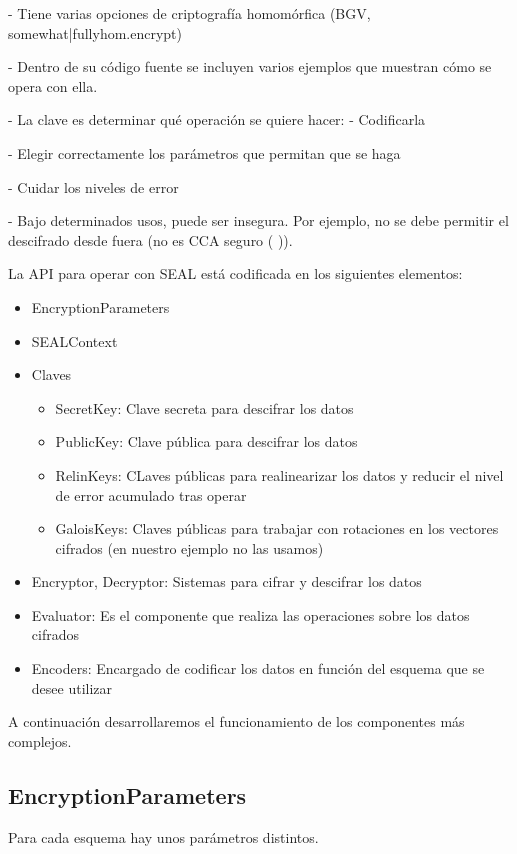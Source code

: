 - Tiene varias opciones de criptografía homomórfica (BGV, {somewhat|fully}hom.encrypt)

- Dentro de su código fuente se incluyen varios ejemplos que muestran cómo se opera con ella.

- La clave es determinar qué operación se quiere hacer:
    - Codificarla

    - Elegir correctamente los parámetros que permitan que se haga

    - Cuidar los niveles de error

- Bajo determinados usos, puede ser insegura. Por ejemplo, no se debe permitir el descifrado desde fuera (no es CCA seguro (\cite{peng_danger_2019} )).

La API para operar con SEAL está codificada en los siguientes elementos:

\begin{itemize}
  \item EncryptionParameters
  \item SEALContext
  \item Claves
  \begin{itemize}
    \item SecretKey: Clave secreta para descifrar los datos
    \item PublicKey: Clave pública para descifrar los datos
    \item RelinKeys: CLaves públicas para realinearizar los datos y reducir el nivel de error acumulado tras operar
    \item GaloisKeys: Claves públicas para trabajar con rotaciones en los vectores cifrados (en nuestro ejemplo no las usamos)
  \end{itemize}
  \item Encryptor, Decryptor: Sistemas para cifrar y descifrar los datos
  \item Evaluator: Es el componente que realiza las operaciones sobre los datos cifrados
  \item Encoders: Encargado de codificar los datos en función del esquema que se desee utilizar
\end{itemize}

A continuación desarrollaremos el funcionamiento de los componentes más complejos.

\subsection{EncryptionParameters}

Para cada esquema hay unos parámetros distintos.


